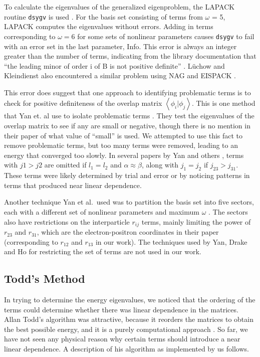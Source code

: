 \documentclass[Dissertation.tex]{subfiles}
\begin{document}
To calculate the eigenvalues of the generalized eigenproblem, the LAPACK 
routine \texttt{dsygv} is used \cite{dsygv}. For the basis set consisting of 
terms from $\omega$ = 5, LAPACK computes the eigenvalues without errors. 
Adding in terms corresponding to $\omega = 6$ for some sets of nonlinear 
parameters causes \texttt{dsygv} to fail with an error set in the last 
parameter, Info. This error is always an integer greater than the number of 
terms, indicating from the library documentation that ``the leading minor of 
order i of B is not positive definite'' \cite{dsygv}. L\"uchow and 
Kleindienst also encountered a similar problem using NAG and EISPACK
\cite{Luchow1993}.

This error does suggest that one approach to identifying problematic terms is 
to check for positive definiteness of the overlap matrix
$\left\langle \phi_i | \phi_j \right\rangle$. This is one method that
Yan et. al use to isolate 
problematic terms \cite{Yan1999}. They test the eigenvalues of the overlap 
matrix to see if any are small or negative, though there is no mention in 
their paper of what value of ``small'' is used. We attempted to use this fact 
to remove problematic terms, but too many terms were removed, leading to an 
energy that converged too slowly. In several papers by Yan and others
\cite{Yan1998,Yan1998a,Yan1999,Drake1995,Yan1997a}, terms with $j1 > j2$ are 
omitted if $l_1 = l_2$ and $\alpha \approx \beta$, along with $j_1 = j_2$ if
$j_{23} > j_{31}$. These terms were likely determined by trial and error 
or by noticing patterns in terms that produced near linear dependence.

Another technique Yan et al.\ used was to partition the basis set into five 
sectors, each with a different set of nonlinear parameters and maximum
$\omega$ \cite{Yan1999}. The sectors also have restrictions on the interparticle
$r_{ij}$ terms, mainly limiting the power of $r_{23}$ and $r_{31}$, which are the 
electron-positron coordinates in their paper (corresponding to $r_{12}$ and
$r_{13}$ in our work). The techniques used by Yan, Drake and Ho for restricting 
the set of terms are not used in our work.


\subsection{Todd's Method}
\label{sec:ToddBound}
In trying to determine the energy eigenvalues, we noticed that the ordering 
of the terms could determine whether there was linear dependence in the 
matrices. Allan Todd's algorithm was attractive, because it reorders the 
matrices to obtain the best possible energy, and it is a purely computational 
approach \cite{Todd2007}. So far, we have not seen any physical reason why 
certain terms should introduce a near linear dependence. A description of his 
algorithm as implemented by us follows.
\end{document}
